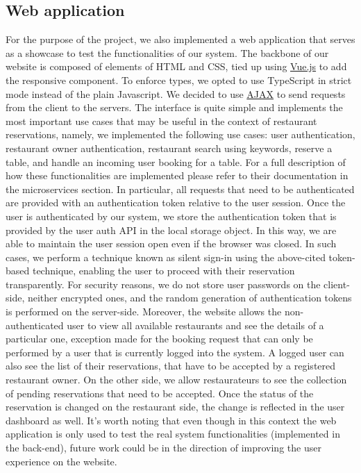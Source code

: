 \subsection{Web application}
For the purpose of the project, we also implemented a web application that serves as a showcase to test the functionalities of our system. The backbone of our website is composed of elements of HTML and CSS, tied up using \href{https://vuejs.org/}{Vue.js} to add the responsive component. To enforce types, we opted to use TypeScript in strict mode instead of the plain Javascript. We decided to use \href{https://en.wikipedia.org/wiki/Ajax_(programming)}{AJAX} to send requests from the client to the servers. The interface is quite simple and implements the most important use cases that may be useful in the context of restaurant reservations, namely, we implemented the following use cases: user authentication, restaurant owner authentication, restaurant search using keywords, reserve a table, and handle an incoming user booking for a table. For a full description of how these functionalities are implemented please refer to their documentation in the microservices section. In particular, all requests that need to be authenticated are provided with an authentication token relative to the user session. Once the user is authenticated by our system, we store the authentication token that is provided by the user auth API in the local storage object. In this way, we are able to maintain the user session open even if the browser was closed. In such cases, we perform a technique known as silent sign-in using the above-cited token-based technique, enabling the user to proceed with their reservation transparently. For security reasons, we do not store user passwords on the client-side, neither encrypted ones, and the random generation of authentication tokens is performed on the server-side. Moreover, the website allows the non-authenticated user to view all available restaurants and see the details of a particular one, exception made for the booking request that can only be performed by a user that is currently logged into the system. A logged user can also see the list of their reservations, that have to be accepted by a registered restaurant owner. On the other side, we allow restaurateurs to see the collection of pending reservations that need to be accepted. Once the status of the reservation is changed on the restaurant side, the change is reflected in the user dashboard as well. It's worth noting that even though in this context the web application is only used to test the real system functionalities (implemented in the back-end), future work could be in the direction of improving the user experience on the website.